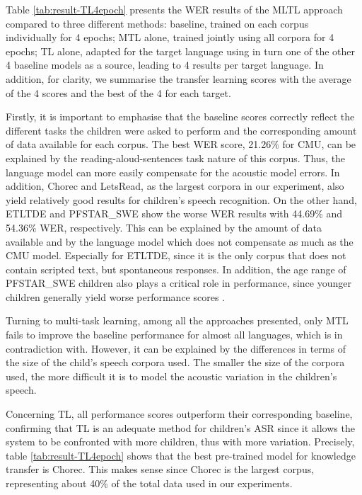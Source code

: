 Table \ref{tab:result-TL4epoch} presents the \ac{WER} results of the \ac{MLTL} approach compared to three different methods: baseline, trained on each corpus individually for 4 epochs; \ac{MTL} alone, trained jointly using all corpora for 4 epochs; \ac{TL} alone, adapted for the target language using in turn one of the other 4 baseline models as a source, leading to 4 results per target language. In addition, for clarity, we summarise the transfer learning scores with the average of the 4 scores and the best of the 4 for each target.

Firstly, it is important to emphasise that the baseline scores correctly reflect the different tasks the children were asked to perform and the corresponding amount of data available for each corpus. The best \ac{WER} score, 21.26\% for CMU, can be explained by the reading-aloud-sentences task nature of this corpus. Thus, the language model can more easily compensate for the acoustic model errors. In addition, Chorec and LetsRead, as the largest corpora in our experiment, also yield relatively good results for children's speech recognition. On the other hand, ETLTDE and PFSTAR\_SWE show the worse \ac{WER} results with 44.69\%  and 54.36\% \ac{WER}, respectively. This can be explained by the amount of data available and by the language model which does not compensate as much as the CMU model. Especially for ETLTDE, since it is the only corpus that does not contain scripted text, but spontaneous responses. In addition, the age range of PFSTAR\_SWE children also plays a critical role in performance, since younger children generally yield worse performance scores \cite{TFchildren}.

Turning to multi-task learning, among all the approaches presented, only MTL fails to improve the baseline performance for almost all languages, which is in contradiction with\cite{TransferLF}.  However, it can be explained by the differences in terms of the size of the child's speech corpora used. The smaller the size of the corpora used, the more difficult it is to model the acoustic variation in the children's speech.


Concerning \ac{TL}, all performance scores outperform their corresponding baseline, confirming that \ac{TL} is an adequate method for children's \ac{ASR} since it allows the system to be confronted with more children, thus with more variation. Precisely, table \ref{tab:result-TL4epoch} shows that the best pre-trained model for knowledge transfer is Chorec.
This makes sense since Chorec is the largest corpus, representing about 40\% of the total data used in our experiments.


